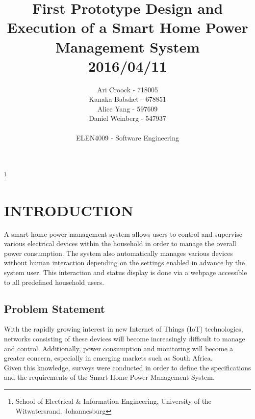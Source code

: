 \documentclass[10pt,twocolumn]{witseiepaper}
\begin{document}
	
	
	\title{First Prototype Design and Execution of a Smart Home Power Management System\\ 2016/04/11}
	
	\author{Ari Croock - 718005\\Kanaka Babshet - 678851\\Alice Yang - 597609\\Daniel Weinberg - 547937\\\\ELEN4009 - Software Engineering}
	\thanks{School of Electrical \& Information Engineering, University of the
		Witwatersrand, Johannesburg}
	
	
	\maketitle
	\thispagestyle{empty}\pagestyle{empty}
	
	
	\section{INTRODUCTION}
	
	A smart home power management system allows users to control and supervise various electrical devices within the household in order to manage the overall power consumption. The system also automatically manages various devices without human interaction depending on the settings enabled in advance by the system user.
	This interaction and status display is done via a webpage accessible to all predefined household users. 
	
	\subsection{Problem Statement}
	With the rapidly growing interest in new Internet of Things (IoT) technologies, networks consisting of these devices will become increasingly difficult to manage and control. Additionally, power consumption and monitoring will become a greater concern, especially in emerging markets such as South Africa.\\
	Given this knowledge, surveys were conducted in order to define the specifications and the requirements of the Smart Home Power Management System. 
	
\end{document}
